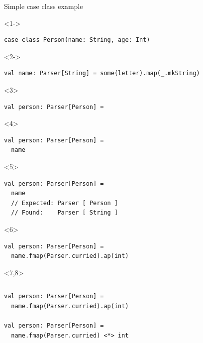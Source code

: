 \documentclass[presentation,aspectratio=169,smaller]{beamer}
\begin{document}
\begin{frame}[label={sec:org5448bc0},fragile,t]{Simple case class example}
 \begin{onlyenv}<1->
\begin{verbatim}
case class Person(name: String, age: Int)
\end{verbatim}
\end{onlyenv}

\begin{onlyenv}<2->
\begin{verbatim}
val name: Parser[String] = some(letter).map(_.mkString)
\end{verbatim}
\end{onlyenv}

\begin{onlyenv}<3>
\begin{verbatim}
val person: Parser[Person] =

\end{verbatim}
\end{onlyenv}

\begin{onlyenv}<4>
\begin{verbatim}
val person: Parser[Person] =
  name

\end{verbatim}
\end{onlyenv}

\begin{onlyenv}<5>
\begin{verbatim}
val person: Parser[Person] =
  name
  // Expected: Parser [ Person ]
  // Found:    Parser [ String ]
\end{verbatim}
\end{onlyenv}

\begin{onlyenv}<6>
\begin{verbatim}
val person: Parser[Person] =
  name.fmap(Parser.curried).ap(int)
\end{verbatim}
\end{onlyenv}

\begin{onlyenv}<7,8>
\begin{columns}
\begin{column}[t]{0.5\columnwidth}
\begin{verbatim}
val person: Parser[Person] =
  name.fmap(Parser.curried).ap(int)

val person: Parser[Person] =
  name.fmap(Parser.curried) <*> int


\end{verbatim}
\end{column}
\end{columns}
\end{onlyenv}
\end{frame}
\end{document}
